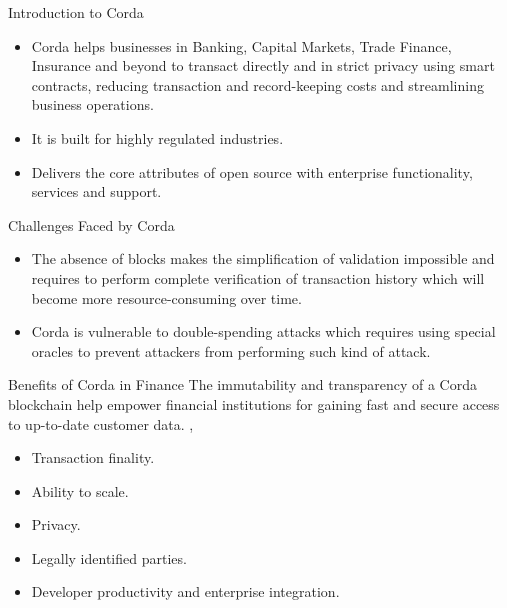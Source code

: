 \documentclass{beamer}
\begin{document}
\begin{frame}{Introduction to  Corda}
	\begin{itemize}

\item Corda helps businesses in Banking, Capital Markets, Trade Finance, Insurance and beyond to transact directly and in strict privacy using smart contracts, reducing transaction and record-keeping costs and streamlining business operations.
	\\[3ex]
\item It is built for highly regulated industries.
	\\[3ex]
\item Delivers the core attributes of open source with enterprise functionality, services and support.
\end{itemize}
\end{frame}
\begin{frame}{Challenges Faced by Corda}
\begin{itemize}
   \item  The absence of blocks makes the simplification of validation impossible and requires to perform complete verification of transaction history which will become more resource-consuming over time. 
	    \\[1ex]
    \item Corda is vulnerable to double-spending attacks which requires using special oracles to prevent attackers from performing such kind of attack.

\end{itemize}
\end{frame}
\begin{frame}{Benefits of Corda in Finance }
    The immutability and transparency of a Corda blockchain help empower financial institutions for gaining fast and secure access to up-to-date customer data. 
		\nocite{alehub.io_2018},\nocite{corda}     
\begin{itemize}
 \item Transaction finality.
 \item Ability to scale.
 \item Privacy.
 \item Legally identified parties.
 \item Developer productivity and enterprise integration.
\end{itemize}

\end{frame}
\begin{frame}
\printbibliography

\end{frame}
\end{document}
